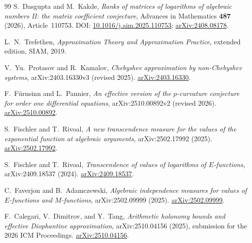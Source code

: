 \documentclass[11pt,oneside]{article}
\theoremstyle{definition}
\theoremstyle{remark}
\begin{document}
\begin{thebibliography}{99}
S.~Dasgupta and M.~Kakde,
\newblock \emph{Ranks of matrices of logarithms of algebraic numbers II: the matrix coefficient conjecture},
\newblock Advances in Mathematics \textbf{487} (2026), Article~110753.
\newblock DOI: \href{https://doi.org/10.1016/j.aim.2025.110753}{10.1016/j.aim.2025.110753};
\href{https://arxiv.org/abs/2408.08178}{arXiv:2408.08178}.



L.~N.~Trefethen,
\newblock \emph{Approximation Theory and Approximation Practice}, extended edition,
\newblock SIAM, 2019.

V.~Yu.~Protasov and R.~Kamalov,
\newblock \emph{Chebyshev approximation by non-Chebyshev systems},
\newblock arXiv:2403.16330v3 (revised 2025).
\newblock \href{https://arxiv.org/abs/2403.16330}{arXiv:2403.16330}.

F.~F\"urnsinn and L.~Pannier,
\newblock \emph{An effective version of the $p$-curvature conjecture for order one differential equations},
\newblock arXiv:2510.00892v2 (revised 2026).
\newblock \href{https://arxiv.org/abs/2510.00892}{arXiv:2510.00892}.

S.~Fischler and T.~Rivoal,
\newblock \emph{A new transcendence measure for the values of the exponential function at algebraic arguments},
\newblock arXiv:2502.17992 (2025).
\newblock \href{https://arxiv.org/abs/2502.17992}{arXiv:2502.17992}.

S.~Fischler and T.~Rivoal,
\newblock \emph{Transcendence of values of logarithms of $E$-functions},
\newblock arXiv:2409.18537 (2024).
\newblock \href{https://arxiv.org/abs/2409.18537}{arXiv:2409.18537}.

C.~Faverjon and B.~Adamczewski,
\newblock \emph{Algebraic independence measures for values of $E$-functions and $M$-functions},
\newblock arXiv:2502.09999 (2025).
\newblock \href{https://arxiv.org/abs/2502.09999}{arXiv:2502.09999}.

F.~Calegari, V.~Dimitrov, and Y.~Tang,
\newblock \emph{Arithmetic holonomy bounds and effective Diophantine approximation},
\newblock arXiv:2510.04156 (2025), submission for the 2026 ICM Proceedings.
\newblock \href{https://arxiv.org/abs/2510.04156}{arXiv:2510.04156}.

\end{thebibliography}
\end{document}
